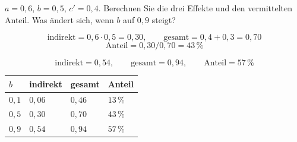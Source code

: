 \begin{aufgabe}
$a = 0{,}6$, $b = 0{,}5$, $c' = 0{,}4$. Berechnen Sie die drei Effekte und den vermittelten Anteil. Was ändert sich, wenn $b$ auf $0{,}9$ steigt?

\loesung
{}
\[ \text{indirekt} = 0{,}6\cdot0{,}5 = 0{,}30, \qquad \text{gesamt} = 0{,}4+0{,}3 = 0{,}70 \]
\[ \text{Anteil} = 0{,}30/0{,}70 = 43\,\% \]

\[ \text{indirekt} = 0{,}54, \qquad \text{gesamt} = 0{,}94, \qquad \text{Anteil} = 57\,\% \]

\begin{center}
{\small
\renewcommand{\arraystretch}{1.46}
\begin{tabular}{@{}P{1.4cm}P{1.8cm}P{1.8cm}P{2.0cm}@{}}
\toprule
$b$ & \textbf{indirekt} & \textbf{gesamt} & \textbf{Anteil}\\
\midrule
$0{,}1$ & $0{,}06$ & $0{,}46$ & $13\,\%$\\
$0{,}5$ & $0{,}30$ & $0{,}70$ & $43\,\%$\\
$0{,}9$ & $0{,}54$ & $0{,}94$ & $57\,\%$\\
\bottomrule
\end{tabular}}
\end{center}

\begin{center}
\begin{minipage}{0.88\textwidth}
\end{minipage}
\end{center}
\end{aufgabe}

